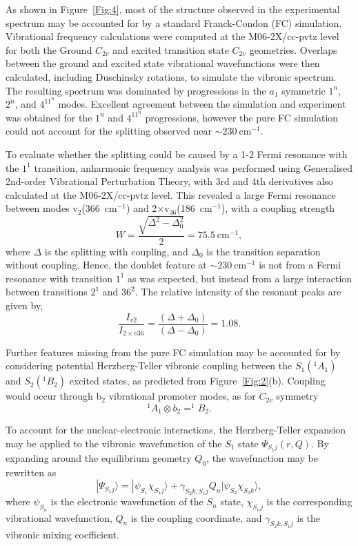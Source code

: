 \documentclass[journal=jpcafh,manuscript=article,layout=onecolumn, 12pt]{achemso}
\begin{document}
As shown in Figure~\ref{Fig:4}, most of the structure observed in the experimental spectrum may be accounted for by a standard Franck-Condon (FC) simulation. Vibrational frequency calculations were computed at the M06-2X/cc-pvtz level for both the Ground $C_{2v}$ and excited transition state $C_{2v}$ geometries. Overlaps between the ground and excited state vibrational wavefunctions were then calculated, including Duschinsky rotations, to simulate the vibronic spectrum. The resulting spectrum was dominated by progressions in the $a_1$ symmetric $1^n$, $2^n$, and $4^11^n$ modes. Excellent agreement between the simulation and experiment was obtained for the $1^n$ and $4^11^n$ progressions, however the pure FC simulation could not account for the splitting observed near $\sim230~$cm$^{-1}$. 

To evaluate whether the splitting could be caused by a 1-2 Fermi resonance with the $1^1$ transition, anharmonic frequency analysis was performed using Generalised 2nd-order Vibrational Perturbation Theory, with 3rd and 4th derivatives also calculated at the M06-2X/cc-pvtz level. This revealed a large Fermi resonance between modes v$_2$(366~cm$^{-1}$) and 2$\times$v$_{36}$(186~cm$^{-1}$), with a coupling strength
\begin{equation}
W = \frac{\sqrt{\Delta^2-\Delta_0^2}}{2} =75.5~\text{cm}^{-1},
\end{equation} 
where $\Delta$ is the splitting with coupling, and $\Delta_0$ is the transition separation without coupling. Hence, the doublet feature at $\sim230~$cm$^{-1}$ is not from a Fermi resonance with transition $1^1$ as was expected, but instead from a large interaction between transitions $2^1$ and $36^2$. The relative intensity of the resonant peaks are given by,
\begin{equation}
\frac{I_{v2}}{I_{2\times v36}} = \frac{\left(\Delta+\Delta_0\right)}{\left(\Delta-\Delta_0\right)}=1.08.
\end{equation}

Further features missing from the pure FC simulation may be accounted for by considering potential Herzberg-Teller vibronic coupling between the $S_1(^1A_1)$ and $S_2(^1B_2)$ excited states, as predicted from Figure~\ref{Fig:2}(b). Coupling would occur through b$_2$ vibrational promoter modes, as for $C_{2v}$ symmetry
\begin{equation}
^1A_1 \otimes b_2 = ^1B_2.
\end{equation}

To account for the nuclear-electronic interactions, the Herzberg-Teller expansion may be applied to the vibronic wavefunction of the $S_1$ state $\Psi_{S_1j}(r,Q)$. By expanding around the equilibrium geometry $Q_0$, the wavefunction may be rewritten as 
\begin{equation}
|\Psi_{S_1j} \rangle = |\psi_{S_1} \chi_{S_1j} \rangle + \gamma_{S_2k,S_1j}Q_n|\psi_{S_2} \chi_{S_2k}\rangle, 
\label{eq:shorthand}
\end{equation}
where $\psi_{S_n}$ is the electronic wavefunction of the $S_n$ state, $\chi_{S_nj}$ is the corresponding vibrational wavefunction, $Q_n$ is the coupling coordinate, and $\gamma_{S_2k,S_1j}$ is the vibronic mixing coefficient.
\end{document}
